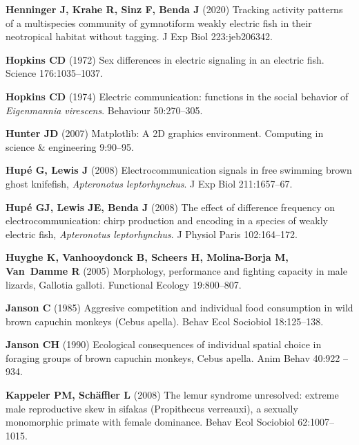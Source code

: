 \documentclass[vruler,JEB]{COB}%
\begin{document}
\begin{thebibliography}{70}
\textbf{Henninger J, Krahe R, Sinz F, Benda J} (2020) Tracking activity patterns of a
  multispecies community of gymnotiform weakly electric fish in their
  neotropical habitat without tagging.
 J Exp Biol 223:jeb206342.

\textbf{Hopkins CD} (1972) Sex differences in electric signaling in an electric fish.
 Science 176:1035--1037.

\textbf{Hopkins CD} (1974) Electric communication: functions in the social behavior of
  \textit{Eigenmannia virescens}.
 Behaviour 50:270--305.

\textbf{Hunter JD} (2007) Matplotlib: A 2D graphics environment.
 Computing in science \& engineering 9:90--95.

\textbf{Hup\'e G, Lewis J} (2008) Electrocommunication signals in free swimming brown
  ghost knifefish, \textit{Apteronotus leptorhynchus}.
 J Exp Biol 211:1657--67.

\textbf{Hup\'e GJ, Lewis JE, Benda J} (2008) The effect of difference frequency on
  electrocommunication: chirp production and encoding in a species of weakly
  electric fish, \textit{Apteronotus leptorhynchus}.
 J Physiol Paris 102:164--172.

\textbf{Huyghe K, Vanhooydonck B, Scheers H, Molina-Borja M, Van~Damme R} (2005)
  Morphology, performance and fighting capacity in male lizards, Gallotia
  galloti.
 Functional Ecology 19:800--807.

\textbf{Janson C} (1985) Aggresive competition and individual food consumption in wild
  brown capuchin monkeys (Cebus apella).
 Behav Ecol Sociobiol 18:125--138.

\textbf{Janson CH} (1990) Ecological consequences of individual spatial choice in
  foraging groups of brown capuchin monkeys, Cebus apella.
 Anim Behav 40:922 -- 934.

\textbf{Kappeler PM, Sch{\"a}ffler L} (2008) The lemur syndrome unresolved: extreme male
  reproductive skew in sifakas (Propithecus verreauxi), a sexually monomorphic
  primate with female dominance.
 Behav Ecol Sociobiol 62:1007--1015.


\end{thebibliography}
\end{document}

